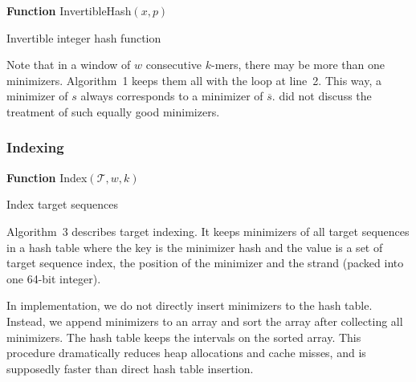 \documentclass{bioinfo}
\begin{document}
\begin{methods}
\begin{algorithm}[tb]
\DontPrintSemicolon
\footnotesize
{}
\BlankLine
\textbf{Function} {\sc InvertibleHash}$(x,p)$
\caption{Invertible integer hash function}
\end{algorithm}

Note that in a window of $w$ consecutive $k$-mers, there may be more than one
minimizers. Algorithm~1 keeps them all with the loop at line~2. This way, a
minimizer of $s$ always corresponds to a minimizer of $\overline{s}$.
\citet{Roberts:2004fv} did not discuss the treatment of such equally good
minimizers.

\subsubsection{Indexing}

\begin{algorithm}[tb]
\DontPrintSemicolon
\footnotesize
{}
\BlankLine
\textbf{Function} {\sc Index}$(\mathcal{T},w,k)$
\caption{Index target sequences}
\end{algorithm}

Algorithm~3 describes target indexing. It keeps minimizers of all target
sequences in a hash table where the key is the minimizer hash and the value is
a set of target sequence index, the position of the minimizer and the strand
(packed into one 64-bit integer).

In implementation, we do not directly insert minimizers to the hash table.
Instead, we append minimizers to an array and sort the array after collecting
all minimizers. The hash table keeps the intervals on the sorted array. This
procedure dramatically reduces heap allocations and cache misses, and is
supposedly faster than direct hash table insertion.


\end{methods}
\end{document}
